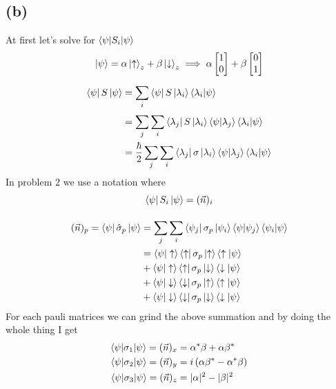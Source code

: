 \documentclass[letter, 10pts]{article}
\newcommand{\hb}{\hbar}
\newcommand{\U}{\uparrow}
\newcommand{\D}{\downarrow}
\begin{document}
\subsection*{(b)} 
At first let's solve for $\braket{\psi | S_i | \psi}$
\[
\ket{\psi} = \alpha \ket{\U}_z  + \beta \ket{\D}_z \implies \alpha 
\begin{bmatrix} 1 \\ 0 \end{bmatrix}  + 
\beta 
\begin{bmatrix} 0 \\ 1 \end{bmatrix}  
\] 
\begin{align*}
	\bra{\psi}S\ket{\psi}&= \sum_{i}^{} \bra{\psi}S\ket{\lambda_i} \braket{\lambda_i | \psi	} \\
	&= \sum_{j}^{} \sum_{i}^{} \bra{\lambda_j} S \ket{\lambda_i} \braket{\psi | \lambda_j} \braket{\lambda_i| \psi} \\
	&= \frac{\hb}{2} \sum_{j}^{} \sum_{i}^{} \bra{\lambda_j} \sigma \ket{\lambda_i} \braket{\psi | \lambda_j} \braket{\lambda_i| \psi} \\
\end{align*}
In problem $2$ we use a notation where 
\[
\bra{\psi} S_i \ket{\psi} = (\vec{n})_i
\] 

\begin{align*}
	(\vec{n})_p 
	=
	\bra{\psi} \hat{\sigma}_p \ket{\psi}
	&= \sum_{j}^{} \sum_{i}^{} \bra{\psi_j} \sigma_p \ket{\psi_i} \braket{\psi | \psi_j} \braket{\psi_i| \psi} \\
	&= \braket{\psi | \U}
	\bra{\U} \sigma_p \ket{\U} \braket{\U| \psi} \\
	&+ 
	\braket{\psi | \U}\bra{\U} \sigma_p \ket{\D} \braket{\D | \psi}  \\ 
	&+
	\braket{\psi | \D} \bra{\D} \sigma_p \ket{\U} \braket{\U | \psi} \\ 
	&+ 
	\braket{\psi | \D} \bra{\D} \sigma_p \ket{\D} \braket{\D | \psi}
\end{align*}
For each pauli matrices we can grind the above summation and by doing the whole thing I get 
\begin{align*}
\braket{\psi | \sigma_1 | \psi } = 	(\vec{n})_x &= \alpha^{*} \beta + \alpha \beta^{*} \\ 
\braket{\psi | \sigma_2 | \psi} = 
	(\vec{n})_y &= i \left(\alpha \beta^{*} - \alpha ^{*} \beta \right) \\ 
\braket{\psi | \sigma_3 | \psi} = 
	(\vec{n})_z &= |\alpha|^2 - |\beta|^2 
\end{align*}
\end{document}
